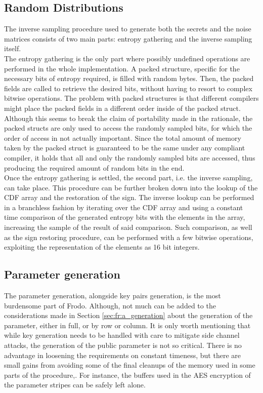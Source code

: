 \subsection{Random Distributions}\label{sec:imp:distributions}
The inverse sampling procedure used to generate both the secrets and the noise matrices consists of two main parts: entropy gathering and the inverse sampling itself.\\
The entropy gathering is the only part where possibly undefined operations are performed in the whole implementation. A packed structure, specific for the necessary bits of entropy required, is filled with random bytes. Then, the packed fields are called to retrieve the desired bits, without having to resort to complex bitwise operations. The problem with packed structures is that different compilers might place the packed fields in a different order inside of the packed struct. Although this seems to break the claim of portability made in the rationale, the packed structs are only used to access the randomly sampled bits, for which the order of access in not actually important. Since the total amount of memory taken by the packed struct is guaranteed to be the same under any compliant compiler, it holds that all and only the randomly sampled bits are accessed, thus producing the required amount of random bits in the end.\\
Once the entropy gathering is settled, the second part, i.e. the inverse sampling, can take place. This procedure can be further broken down into the lookup of the CDF array and the restoration of the sign.
The inverse lookup can be performed in a branchless fashion by iterating over the CDF array and using a constant time comparison of the generated entropy bits with the elements in the array, increasing the sample of the result of said comparison. Such comparison, as well as the sign restoring procedure, can be performed with a few bitwise operations, exploiting the representation of the elements as 16 bit integers.

\subsection{Parameter generation}
The parameter generation, alongside key pairs generation, is the most burdensome part of Frodo. Although, not much can be added to the considerations made in Section \ref{sec:fr:a_generation} about the generation of the parameter, either in full, or by row or column. It is only worth mentioning that while key generation needs to be handled with care to mitigate side channel attacks, the generation of the public parameter is not so critical. There is no advantage in loosening the requirements on constant timeness, but there are small gains from avoiding some of the final cleanups of the memory used in some parts of the procedure,. For instance, the buffers used in the AES encryption of the parameter stripes can be safely left alone.\\

